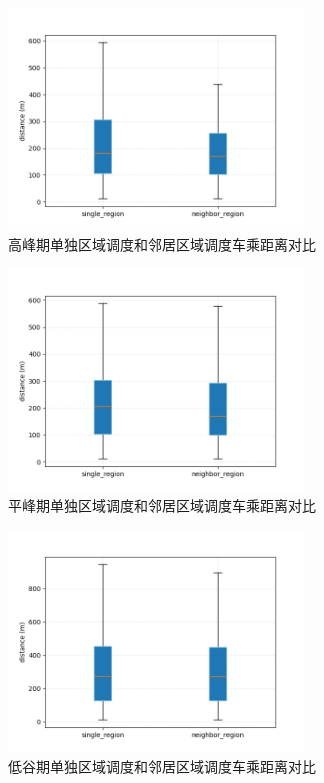\begin{figure}[h]
  \centering
  \includegraphics[height=0.3\textheight,width=0.7\textwidth]{figures/高峰车乘匹配}
  \caption{高峰期单独区域调度和邻居区域调度车乘距离对比}\label{fig:highRegionDistance}
\end{figure}

\begin{figure}[h]
  \centering
  \includegraphics[height=0.3\textheight,width=0.7\textwidth]{figures/平峰车乘匹配}
  \caption{平峰期单独区域调度和邻居区域调度车乘距离对比}\label{fig:pingRegionDistance}
\end{figure}

\begin{figure}[h]
  \centering
  \includegraphics[height=0.3\textheight,width=0.7\textwidth]{figures/低谷车乘匹配}
  \caption{低谷期单独区域调度和邻居区域调度车乘距离对比}\label{fig:shaoRegionDistance}
\end{figure}

